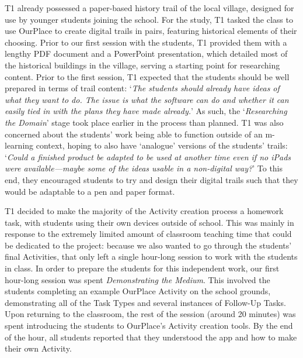 \documentclass[,hyphens]{sigchi}
\begin{document}
T1 already possessed a paper-based history trail of the local village, designed for use by younger students joining the school. For the study, T1 tasked the class to use OurPlace to create digital trails in pairs, featuring historical elements of their choosing. Prior to our first session with the students, T1 provided them with a lengthy PDF document and a PowerPoint presentation, which detailed most of the historical buildings in the village, serving a starting point for researching content. Prior to the first session, T1 expected that the students should be well prepared in terms of trail content: `\textit{The students should already have ideas of what they want to do. The issue is what the software can do and whether it can easily tied in with the plans they have made already.}'  As such, the `\textit{Researching the Domain}' stage took place earlier in the process than planned. T1 was also concerned about the students' work being able to function outside of an m-learning context, hoping to also have `analogue' versions of the students' trails: `\textit{Could a finished product be adapted to be used at another time even if no iPads were available---maybe some of the ideas usable in a non-digital way?}' To this end, they encouraged students to try and design their digital trails such that they would be adaptable to a pen and paper format.

T1 decided to make the majority of the Activity creation process a homework task, with students using their own devices outside of school. This was mainly in response to the extremely limited amount of classroom teaching time that could be dedicated to the project: because we also wanted to go through the students' final Activities, that only left a single hour-long session to work with the students in class. In order to prepare the students for this independent work, our first hour-long session was spent \textit{Demonstrating the Medium}. This involved the students completing an example OurPlace Activity on the school grounds, demonstrating all of the Task Types and several instances of Follow-Up Tasks. Upon returning to the classroom, the rest of the session (around 20 minutes) was spent introducing the students to OurPlace's Activity creation tools. By the end of the hour, all students reported that they understood the app and how to make their own Activity.
\end{document}
